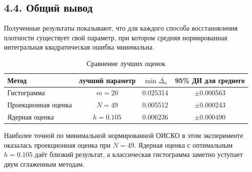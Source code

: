 \documentclass[12pt,a4paper]{article}
\begin{document}
\subsection*{4.4. Общий вывод}

Полученные результаты показывают, что для каждого способа восстановления плотности существует свой параметр, при котором средняя нормированная интегральная квадратическая ошибка минимальна.

\begin{table}[H]
\centering
\caption{Сравнение лучших оценок}
\begin{tabular}{lccc}
\toprule
Метод & лучший параметр & $\min\overline{\Delta_n}$ & 95\% ДИ для среднего \\
\midrule
Гистограмма & $m=20$ & 0.025314 & $\pm$0.000563 \\
Проекционная оценка & $N=49$ & 0.005512 & $\pm$0.000243 \\
Ядерная оценка & $h=0.105$ & 0.006236 & $\pm$0.000490 \\
\bottomrule
\end{tabular}
\end{table}

Наиболее точной по минимальной нормированной ОИСКО в этом эксперименте
оказалась проекционная оценка при $N=49$. Ядерная оценка с оптимальным
$h=0.105$ даёт близкий результат, а классическая гистограмма заметно уступает
двум сглаженным методам.
\end{document}

